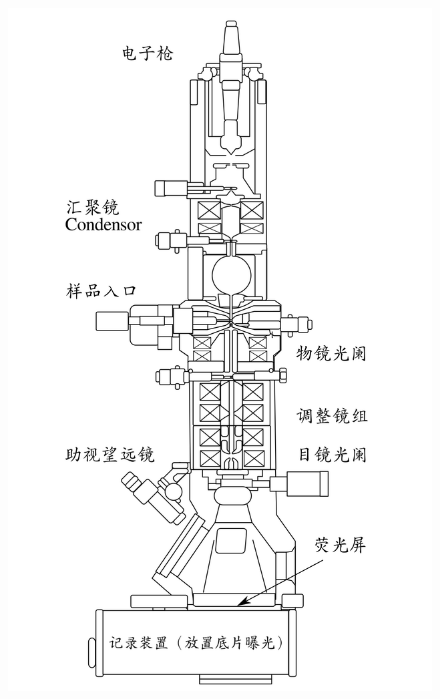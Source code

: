 \documentclass[aps,pre,12pt,preprint,%
	onecolumn,showpacs,showkeys,nofootinbib]{revtex4-1}
\begin{document}
	\begin{figure}[!ht]
	\centering
	\newcommand{\TEMfigHeight}{22\baselineskip}
	\includegraphics[height=\TEMfigHeight]{Scheme_TEM}\ 

\end{figure}
\end{document}
